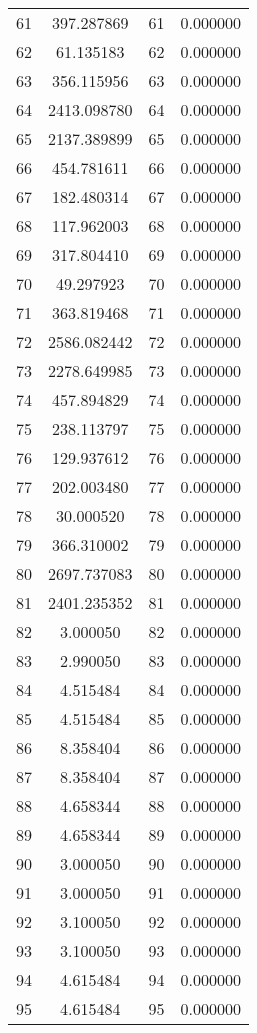 \documentclass[12pt]{article}
\begin{document}
\begin{longtable}{@{}cccc@{}}
61 & 397.287869 & 61 & 0.000000 \\
62 & 61.135183 & 62 & 0.000000 \\
63 & 356.115956 & 63 & 0.000000 \\
64 & 2413.098780 & 64 & 0.000000 \\
65 & 2137.389899 & 65 & 0.000000 \\
66 & 454.781611 & 66 & 0.000000 \\
67 & 182.480314 & 67 & 0.000000 \\
68 & 117.962003 & 68 & 0.000000 \\
69 & 317.804410 & 69 & 0.000000 \\
70 & 49.297923 & 70 & 0.000000 \\
71 & 363.819468 & 71 & 0.000000 \\
72 & 2586.082442 & 72 & 0.000000 \\
73 & 2278.649985 & 73 & 0.000000 \\
74 & 457.894829 & 74 & 0.000000 \\
75 & 238.113797 & 75 & 0.000000 \\
76 & 129.937612 & 76 & 0.000000 \\
77 & 202.003480 & 77 & 0.000000 \\
78 & 30.000520 & 78 & 0.000000 \\
79 & 366.310002 & 79 & 0.000000 \\
80 & 2697.737083 & 80 & 0.000000 \\
81 & 2401.235352 & 81 & 0.000000 \\
82 & 3.000050 & 82 & 0.000000 \\
83 & 2.990050 & 83 & 0.000000 \\
84 & 4.515484 & 84 & 0.000000 \\
85 & 4.515484 & 85 & 0.000000 \\
86 & 8.358404 & 86 & 0.000000 \\
87 & 8.358404 & 87 & 0.000000 \\
88 & 4.658344 & 88 & 0.000000 \\
89 & 4.658344 & 89 & 0.000000 \\
90 & 3.000050 & 90 & 0.000000 \\
91 & 3.000050 & 91 & 0.000000 \\
92 & 3.100050 & 92 & 0.000000 \\
93 & 3.100050 & 93 & 0.000000 \\
94 & 4.615484 & 94 & 0.000000 \\
95 & 4.615484 & 95 & 0.000000 \\

\end{longtable}
\end{document}
